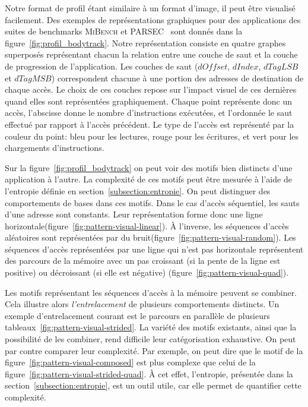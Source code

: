 Notre format de profil étant similaire à un format d'image, il peut être visualisé facilement.
Des exemples de représentations graphiques pour des applications des suites de benchmarks \textsc{MiBench}\cite{guthaus2001mibench} et \textsc{PARSEC}~\cite{bienia2008parsec} sont donnés dans la figure~\ref{fig:profil_bodytrack}.
Notre représentation consiste en quatre graphes superposés représentant chacun la relation entre une couche de saut et la couche de progression de l'application.
Les couches de saut ($dOffset$, $dIndex$, $dTagLSB$ et $dTagMSB$) correspondent chacune à une portion des adresses de destination de chaque accès.
Le choix de ces couches repose sur l'impact visuel de ces dernières quand elles sont représentées graphiquement.
Chaque point représente donc un accès, l'abscisse donne le nombre d'instructions exécutées, et l'ordonnée le saut effectué par rapport à l'accès précédent.
Le type de l'accès est représenté par la couleur du point: bleu pour les lectures, rouge pour les écritures, et vert pour les chargements d'instructions.

Sur la figure~\ref{fig:profil_bodytrack} on peut voir des motifs bien distincts d'une application à l'autre.
La complexité de ces motifs peut être mesurée à l'aide de l'entropie définie en section~\ref{subsection:entropie}.
On peut distinguer des comportements de bases dans ces motifs.
Dans le cas d'accès séquentiel, les sauts d'une adresse sont constants.
Leur représentation forme donc une ligne horizontale(figure~\ref{fig:pattern-visual-linear}).
À l'inverse, les séquences d'accès aléatoires sont représentées par du bruit(figure~\ref{fig:pattern-visual-random}).
Les séquences d'accès représentées par une ligne qui n'est pas horizontale représentent des parcours de la mémoire avec un pas croissant (si la pente de la ligne est positive) ou décroissant (si elle est négative) (figure~\ref{fig:pattern-visual-quad}).

Les motifs représentant les séquences d'accès à la mémoire peuvent se combiner.
Cela illustre alors \emph{l'entrelacement} de plusieurs comportements distincts.
Un exemple d'entrelacement courant est le  parcours en parallèle de plusieurs tableaux~\ref{fig:pattern-visual-strided}.
La variété des motifs existants, ainsi que la possibilité de les combiner, rend difficile leur catégorisation exhaustive.
On peut par contre comparer leur complexité.
Par exemple, on peut dire que le motif de la figure~\ref{fig:pattern-visual-composed} est plus complexe que celui de la figure~\ref{fig:pattern-visual-strided-quad}.
À cet effet, l'entropie, présentée dans la section~\ref{subsection:entropie}, est un outil utile, car elle permet de quantifier cette complexité.

